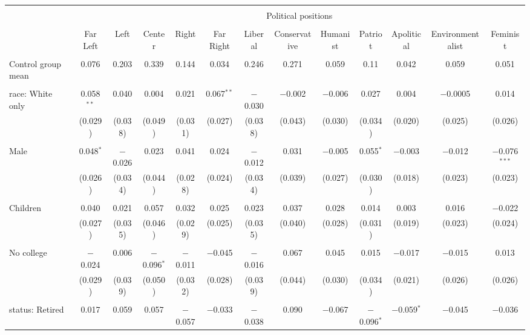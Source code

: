 
\begin{tabular}{@{\extracolsep{5pt}}lcccccccccccc} 
\\[-1.8ex]\hline 
\hline \\[-1.8ex] 
 & \multicolumn{12}{c}{Political positions} \\ 
\cline{2-13} 
\\[-1.8ex] & Far Left & Left & Center & Right & Far Right & Liberal & Conservative & Humanist & Patriot & Apolitical & Environmentalist & Feminist \\ 
\hline \\[-1.8ex] 
 Control group mean & 0.076 & 0.203 & 0.339 & 0.144 & 0.034 & 0.246 & 0.271 & 0.059 & 0.11 & 0.042 & 0.059 & 0.051  \\ \hline \\[-1.8ex] race: White only & 0.058$^{**}$ & 0.040 & 0.004 & 0.021 & 0.067$^{**}$ & $-$0.030 & $-$0.002 & $-$0.006 & 0.027 & 0.004 & $-$0.0005 & 0.014 \\ 
  & (0.029) & (0.038) & (0.049) & (0.031) & (0.027) & (0.038) & (0.043) & (0.030) & (0.034) & (0.020) & (0.025) & (0.026) \\ 
  & & & & & & & & & & & & \\ 
 Male & 0.048$^{*}$ & $-$0.026 & 0.023 & 0.041 & 0.024 & $-$0.012 & 0.031 & $-$0.005 & 0.055$^{*}$ & $-$0.003 & $-$0.012 & $-$0.076$^{***}$ \\ 
  & (0.026) & (0.034) & (0.044) & (0.028) & (0.024) & (0.034) & (0.039) & (0.027) & (0.030) & (0.018) & (0.023) & (0.023) \\ 
  & & & & & & & & & & & & \\ 
 Children & 0.040 & 0.021 & 0.057 & 0.032 & 0.025 & 0.023 & 0.037 & 0.028 & 0.014 & 0.003 & 0.016 & $-$0.022 \\ 
  & (0.027) & (0.035) & (0.046) & (0.029) & (0.025) & (0.035) & (0.040) & (0.028) & (0.031) & (0.019) & (0.023) & (0.024) \\ 
  & & & & & & & & & & & & \\ 
 No college & $-$0.024 & 0.006 & $-$0.096$^{*}$ & $-$0.011 & $-$0.045 & $-$0.016 & 0.067 & 0.045 & 0.015 & $-$0.017 & $-$0.015 & 0.013 \\ 
  & (0.029) & (0.039) & (0.050) & (0.032) & (0.028) & (0.039) & (0.044) & (0.030) & (0.034) & (0.021) & (0.026) & (0.026) \\ 
  & & & & & & & & & & & & \\ 
 status: Retired & 0.017 & 0.059 & 0.057 & $-$0.057 & $-$0.033 & $-$0.038 & 0.090 & $-$0.067 & $-$0.096$^{*}$ & $-$0.059$^{*}$ & $-$0.045 & $-$0.036 \\ 

\end{tabular}
